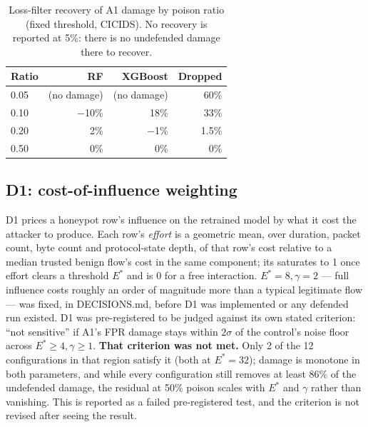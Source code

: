 \begin{table}[t]
  \centering
  \caption{Loss-filter recovery of A1 damage by poison ratio (fixed threshold, CICIDS). No
  recovery is reported at 5\%: there is no undefended damage there to recover.}
  \label{tab:loss-filter}
  \small
  \begin{tabular}{lrrr}
    \toprule
    Ratio & RF & XGBoost & Dropped \\
    \midrule
    0.05 & (no damage) & (no damage) & 60\% \\
    0.10 & $-$10\%     & 18\%        & 33\% \\
    0.20 & 2\%          & $-$1\%      & 1.5\% \\
    0.50 & 0\%          & 0\%         & 0\% \\
    \bottomrule
  \end{tabular}
\end{table}

\subsection{D1: cost-of-influence weighting}
D1 prices a honeypot row's influence on the retrained model by what it cost the attacker to
produce. Each row's \emph{effort} is a geometric mean, over duration, packet count, byte count
and protocol-state depth, of that row's cost relative to a median trusted benign flow's cost in
the same component; its  saturates to 1 once effort clears a threshold
$E^*$ and is 0 for a free interaction. $E^*=8,\gamma=2$ — full influence costs roughly an order
of magnitude more than a typical legitimate flow — was fixed, in DECISIONS.md, before D1 was
implemented or any defended run existed.
D1 was pre-registered to be judged against its own stated criterion: “not sensitive” if A1's
FPR damage stays within $2\sigma$ of the control's noise floor across $E^*\ge4,\gamma\ge1$.
\textbf{That criterion was not met.} Only 2 of the 12 configurations in that region satisfy it
(both at $E^*=32$); damage is monotone in both parameters, and while every configuration still
removes at least 86\% of the undefended damage, the residual at 50\% poison scales with $E^*$
and $\gamma$ rather than vanishing. This is reported as a failed pre-registered test, and the
criterion is not revised after seeing the result.

